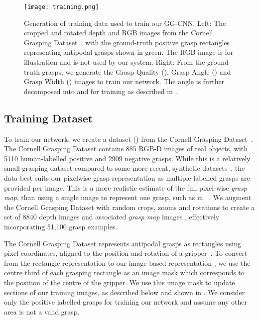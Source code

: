 \documentclass[conference]{IEEEtran}
\begin{document}
\begin{figure}[tpb]
    \centering
    \texttt{[image: training.png]}
    \vspace{-6mm}
    \caption{Generation of training data used to train our GG-CNN.  Left: The cropped and rotated depth and RGB images from the Cornell Grasping Dataset~\cite{Lenz2015DeepGrasps}, with the ground-truth positive grasp rectangles representing antipodal grasps shown in green.  The RGB image is for illustration and is not used by our system.  Right: From the ground-truth grasps, we generate the Grasp Quality (), Grasp  Angle () and Grasp Width () images to train our network.  The angle is further decomposed into  and  for training as described in .
    }
  \label{fig:training} 
  \vspace{-6mm}
\end{figure}

\subsection{Training Dataset}
\label{sec:trainingdata}

To train our network, we create a dataset () from the Cornell Grasping Dataset~\cite{Lenz2015DeepGrasps}.  The Cornell Grasping Dataset contains 885 RGB-D images of real objects, with 5110 human-labelled positive and 2909 negative grasps.  While this is a relatively small grasping dataset compared to some more recent, synthetic datasets~\cite{Mahler2016Dex1, Mahler2017Dex2}, the data best suits our pixelwise grasp representation as multiple labelled grasps are provided per image. 
This is a more realistic estimate of the full pixel-wise \textit{grasp map}, than using a single image to represent one grasp, such as in ~\cite{Mahler2017Dex2}.
We augment the Cornell Grasping Dataset with random crops, zooms and rotations to create a set of 8840 depth images and associated \textit{grasp map} images , effectively incorporating 51,100 grasp examples.  

The Cornell Grasping Dataset represents antipodal grasps as rectangles using pixel coordinates, aligned to the position and rotation of a gripper~\cite{Jiang2011EfficientRepresentation}.  To convert from the rectangle representation to our image-based representation , we use the centre third of each grasping rectangle as an image mask which corresponds to the position of the centre of the gripper.  We use this image mask to update sections of our training images, as described below and shown in .  We consider only the positive labelled grasps for training our network and assume any other area is not a valid grasp.
\end{document}
